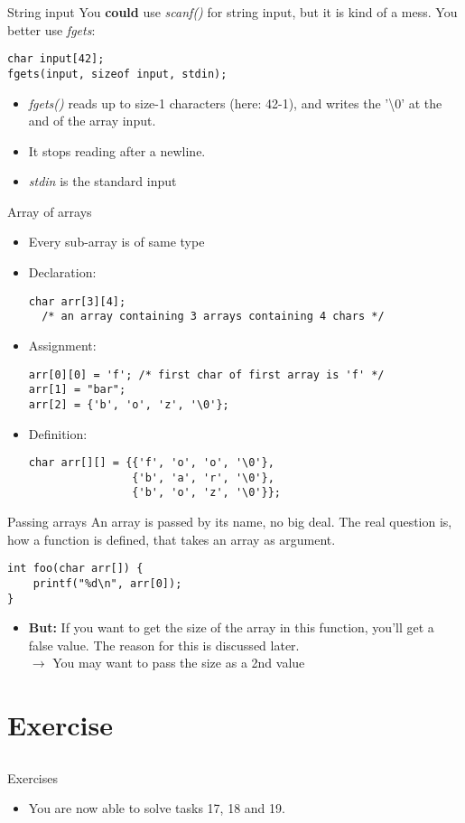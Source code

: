 \begin{frame}[fragile]{String input}
	You \textbf{could} use \textit{scanf()} for string input, but it is kind of a mess. You better use \textit{fgets}:
	\begin{lstlisting}[numbers=none]
char input[42];
fgets(input, sizeof input, stdin);
\end{lstlisting}
	\begin{itemize}
		\item \textit{fgets()} reads up to size-1 characters (here: 42-1), and writes the '\textbackslash0' at the and of the array input.
		\item It stops reading after a newline.
		\item \textit{stdin} is the standard input
	\end{itemize}
\end{frame}
\begin{frame}[fragile]{Array of arrays}
	\begin{itemize}
		\item Every sub-array is of same type
		\item Declaration:
		\begin{lstlisting}[numbers=none]
char arr[3][4];
  /* an array containing 3 arrays containing 4 chars */
\end{lstlisting}
		\item Assignment:
		\begin{lstlisting}[numbers=none]
arr[0][0] = 'f'; /* first char of first array is 'f' */
arr[1] = "bar";
arr[2] = {'b', 'o', 'z', '\0'};
\end{lstlisting}
		\item Definition:
		\begin{lstlisting}[numbers=none]
char arr[][] = {{'f', 'o', 'o', '\0'},
				{'b', 'a', 'r', '\0'},
				{'b', 'o', 'z', '\0'}};
\end{lstlisting}
	\end{itemize}
\end{frame}
\begin{frame}[fragile]{Passing arrays}
	An array is passed by its name, no big deal. The real question is, how a function is defined, that takes an array as argument.
	\begin{lstlisting}[numbers=none]
int foo(char arr[]) {
	printf("%d\n", arr[0]);
}
\end{lstlisting}
	\begin{itemize}
		\item \textbf{But:} If you want to get the size of the array in this function, you'll get a false value. The reason for this is discussed later.\\
		$\rightarrow$ You may want to pass the size as a 2nd value
	\end{itemize}
\end{frame}
\section{Exercise}
\subsection{}
\begin{frame}{Exercises}
	\begin{itemize}
		\item You are now able to solve tasks 17, 18 and 19.
	\end{itemize}
\end{frame}


